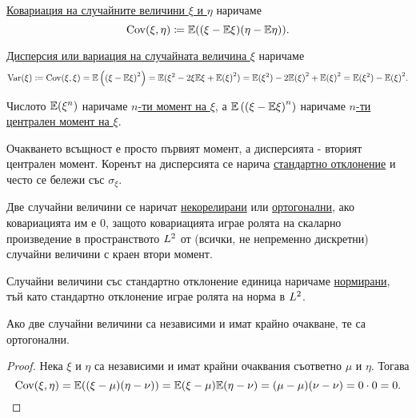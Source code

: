\documentclass[numbers=endperiod, DIV=15, bibliography=totocnumbered]{scrartcl}
\begin{document}
\begin{definition}
  \uline{Ковариация на случайните величини $\xi$ и $\eta$} наричаме
  \begin{displaymath}
    \operatorname{Cov}(\xi, \eta)
    \coloneqq
    \mathbb{E}((\xi - \mathbb{E} \xi) (\eta - \mathbb{E} \eta)).
  \end{displaymath}

  \uline{Дисперсия или вариация на случайната величина $\xi$} наричаме
  \begin{displaymath}
    \operatorname{Var}(\xi)
    \coloneqq
    \operatorname{Cov}(\xi, \xi)
    =
    \mathbb{E} \left({(\xi - \mathbb{E} \xi)}^2 \right)
    =
    \mathbb{E}(\xi^2 - 2 \xi \mathbb{E} \xi + {\mathbb{E}(\xi)}^2)
    =
    \mathbb{E}(\xi^2) - 2 {\mathbb{E}(\xi)}^2 + {\mathbb{E}(\xi)}^2
    =
    \mathbb{E}(\xi^2) - {\mathbb{E}(\xi)}^2.
  \end{displaymath}

  Числото $\mathbb{E}(\xi^n)$ наричаме \uline{$n$-ти момент на $\xi$}, а $\mathbb{E} \left( {(\xi - \mathbb{E} \xi)}^n \right)$ наричаме \uline{$n$-ти централен момент на $\xi$}.

  Очакването всъщност е просто първият момент, а дисперсията - вторият централен момент. Коренът на дисперсията се нарича \uline{стандартно отклонение} и често се бележи със $\sigma_\xi$.

  Две случайни величини се наричат \uline{некорелирани} или \uline{ортогонални}, ако ковариацията им е $0$, защото ковариацията играе ролята на скаларно произведение в пространството $L^2$ от (всички, не непременно дискретни) случайни величини с краен втори момент.

  Случайни величини със стандартно отклонение единица наричаме \uline{нормирани}, тъй като стандартно отклонение играе ролята на норма в $L^2$.
\end{definition}

\begin{proposition}\label{thm:orthogonal-if-independent}
  Ако две случайни величини са независими и имат крайно очакване, те са ортогонални.
\end{proposition}
\begin{proof}
  Нека $\xi$ и $\eta$ са независими и имат крайни очаквания съответно $\mu$ и $\eta$. Тогава
  \begin{displaymath}
    \operatorname{Cov}(\xi, \eta)
    =
    \mathbb{E}((\xi - \mu) (\eta - \nu))
    =
    \mathbb{E}(\xi - \mu) \mathbb{E}(\eta - \nu)
    =
    (\mu - \mu) (\nu - \nu)
    =
    0 \cdot 0
    =
    0.
  \end{displaymath}
\end{proof}
\end{document}
